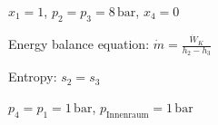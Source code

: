 \( x_1 = 1 \), \( p_2 = p_3 = 8 \, \text{bar} \), \( x_4 = 0 \)  

Energy balance equation:  
\( \dot{m} = \frac{\dot{W}_K}{h_2 - h_3} \)  

Entropy: \( s_2 = s_3 \)  

\( p_4 = p_1 = 1 \, \text{bar} \), \( p_{\text{Innenraum}} = 1 \, \text{bar} \)